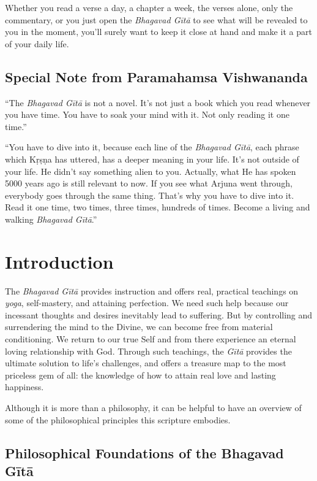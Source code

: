 \documentclass[12pt, twoside, openright]{memoir}
\begin{document}
Whether you read a verse a day, a chapter a week, the verses alone, only the commentary, or you just open the \textit{Bhagavad Gītā} to see what will be revealed to you in the moment, you’ll surely want to keep it close at hand and make it a part of your daily life.

\section{Special Note from Paramahamsa Vishwananda}\label{sec-special-note-from-paramahamsa-vishwananda}

\enquote{The \textit{Bhagavad Gītā} is not a novel. It's not just a book which you read whenever you have time. You have to soak your mind with it. Not only reading it one time.}

\enquote{You have to dive into it, because each line of the \textit{Bhagavad Gītā}, each phrase which Kṛṣṇa has uttered, has a deeper meaning in your life. It’s not outside of your life. He didn’t say something alien to you. Actually, what He has spoken 5000 years ago is still relevant to now. If you see what Arjuna went through, everybody goes through the same thing. That’s why you have to dive into it. Read it one time, two times, three times, hundreds of times. Become a living and walking \textit{Bhagavad Gītā}.} \chapter{Introduction}\label{chap-introduction}

\bigskip

The \textit{Bhagavad Gītā} provides instruction and offers real, practical teachings on \textit{yoga}, self-mastery, and attaining perfection. We need such help because our incessant thoughts and desires inevitably lead to suffering. But by controlling and surrendering the mind to the Divine, we can become free from material conditioning. We return to our true Self and from there experience an eternal loving relationship with God. Through such teachings, the \textit{Gītā} provides the ultimate solution to life’s challenges, and offers a treasure map to the most priceless gem of all: the knowledge of how to attain real love and lasting happiness.

Although it is more than a philosophy, it can be helpful to have an overview of some of the philosophical principles this scripture embodies.

\section{Philosophical Foundations of the Bhagavad Gītā}\label{sec-philosophical-foundations-of-the-bhagavad-gita}
\end{document}
